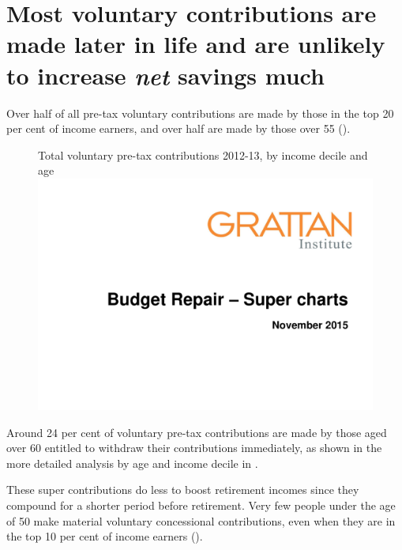\section{Most voluntary contributions are made later in life and are unlikely to increase \emph{net} savings much\label{sec:SUPER-4-3}}
Over half of all pre-tax voluntary contributions are made by those in the top 20 per cent of income earners, and over half are made by those over 55 ().\DEVIATION{} 
\begin{figure}
%
{Total voluntary pre-tax contributions 2012-13, by income decile and age}\label{fig:SUPER-4-5}
\includegraphics[width=\columnwidth,page=23]{super-atlas/PPTX.pdf}


\vspace{2\baselineskip} %
\end{figure}

Around 24 per cent of voluntary pre-tax contributions are made by those aged over 60 entitled to withdraw their contributions immediately, as shown in the more detailed analysis by age and income decile in .

These super contributions do less to boost retirement incomes since they compound for a shorter period before retirement. Very few people under the age of 50 make material voluntary concessional contributions, even when they are in the top 10 per cent of income earners ().

